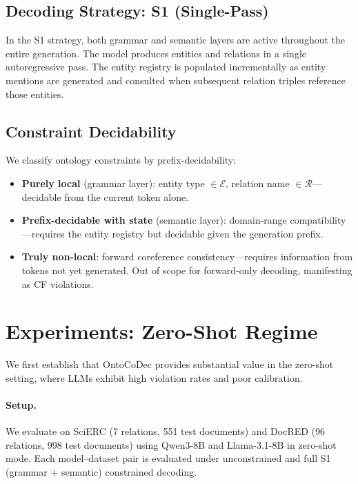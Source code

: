 \documentclass[11pt,a4paper]{article}
\newcommand{\system}{OntoCoDec}
\begin{document}
\subsection{Decoding Strategy: S1 (Single-Pass)}

In the S1 strategy, both grammar and semantic layers are active throughout the entire generation. The model produces entities and relations in a single autoregressive pass. The entity registry is populated incrementally as entity mentions are generated and consulted when subsequent relation triples reference those entities.

\subsection{Constraint Decidability}

We classify ontology constraints by prefix-decidability:
\begin{itemize}
    \item \textbf{Purely local} (grammar layer): entity type $\in \mathcal{E}$, relation name $\in \mathcal{R}$---decidable from the current token alone.
    \item \textbf{Prefix-decidable with state} (semantic layer): domain-range compatibility---requires the entity registry but decidable given the generation prefix.
    \item \textbf{Truly non-local}: forward coreference consistency---requires information from tokens not yet generated. Out of scope for forward-only decoding, manifesting as CF violations.
\end{itemize}

\section{Experiments: Zero-Shot Regime}
\label{sec:zs}

We first establish that \system{} provides substantial value in the zero-shot setting, where LLMs exhibit high violation rates and poor calibration.

\paragraph{Setup.} We evaluate on SciERC (7 relations, 551 test documents) and DocRED (96 relations, 998 test documents) using Qwen3-8B and Llama-3.1-8B in zero-shot mode. Each model--dataset pair is evaluated under unconstrained and full S1 (grammar + semantic) constrained decoding.
\end{document}
